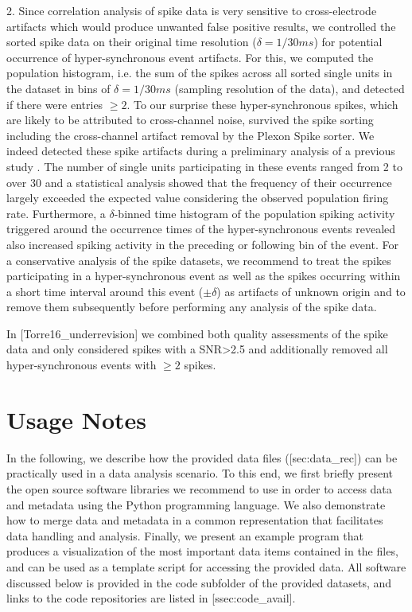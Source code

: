 {2. Since correlation analysis of spike data is very sensitive to cross-electrode artifacts which would produce unwanted false positive results, we controlled the sorted spike data on their original time resolution ($\delta=1/30ms$) for potential occurrence of hyper-synchronous event artifacts. For this, we computed the population histogram, i.e. the sum of the spikes across all sorted single units in the dataset in bins of $\delta=1/30ms$ (sampling resolution of the data), and detected if there were entries $\ge2$. To our surprise these hyper-synchronous spikes, which are likely to be attributed to cross-channel noise, survived the spike sorting including the cross-channel artifact removal by the Plexon Spike sorter. We indeed detected these spike artifacts during a preliminary analysis of a previous study . The number of single units participating in these events ranged from 2 to over 30 and a statistical analysis showed that the frequency of their occurrence largely exceeded the expected value considering the observed population firing rate. Furthermore, a $\delta$-binned time histogram of the population spiking activity triggered around the occurrence times of the hyper-synchronous events revealed also increased spiking activity in the preceding or following bin of the event. For a conservative analysis of the spike datasets, we recommend to treat the spikes participating in a hyper-synchronous event as well as the spikes occurring within a short time interval around this event (${\scriptstyle \pm\delta}$) as artifacts of unknown origin and to remove them subsequently before performing any analysis of the spike data.

In [Torre16\_underrevision] we combined both quality assessments of the spike data and only considered spikes with a SNR>2.5 and additionally removed all hyper-synchronous events with $\ge2$ spikes. 

\section{Usage Notes}

In the following, we describe how the provided data files ([sec:data\_rec]) can be practically used in a data analysis scenario. To this end, we first briefly present the open source software libraries we recommend to use in order to access data and metadata using the Python programming language. We also demonstrate how to merge data and metadata in a common representation that facilitates data handling and analysis. Finally, we present an example program that produces a visualization of the most important data items contained in the files, and can be used as a template script for accessing the provided data. All software discussed below is provided in the code subfolder of the provided datasets, and links to the code repositories are listed in [ssec:code\_avail].

}
